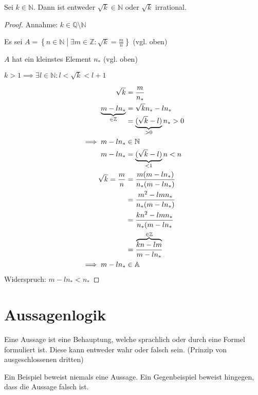 \begin{theorem}
  Sei $k \in \mathbb{N}$. Dann ist entweder $\sqrt{k} \in \mathbb{N}$ oder $\sqrt{k}$ irrational.
\end{theorem}
\begin{proof}
  Annahme: $k \in \mathbb{Q} \setminus \mathbb{N}$

  Es sei \( A = \left\{ n \in \mathbb{N} \middle| \exists m \in \mathbb{Z}: \sqrt{k} = \frac{m}{n} \right\} \) (vgl. oben)

  $A$ hat ein kleinstes Element $n_{*}$ (vgl. oben)

  $k > 1 \implies \exists l \in \mathbb{N}: l < \sqrt{k} < l+1$

  \begin{align*}
    \sqrt{k} &= \frac{m}{n_{*}} \\
    \smash{\underbrace{m - ln_{*}}_{\in \mathbb{Z}}} &= \sqrt{k} n_{*} - ln_{*} \\
    \, &= \underbrace{(\sqrt{k} - l)}_{> 0} n_{*} > 0 \\
    \implies m - ln_{*} &\in \mathbb{N} \\
    m-ln_{*} &= \underbrace{(\sqrt{k} - l)}_{< 1} n < n \\
    \sqrt{k} = \frac{m}{n} &= \frac{m(m-ln_{*})}{n_{*}(m-ln_{*})} \\
    \, &= \frac{m^2 - lmn_*}{n_{*}(m-ln_{*})} \\
    \, &= \frac{kn^2 - lmn_{*}}{n_{*}(m-ln_{*}} \\
    \, &= \frac{\overbrace{kn - lm}^{\in \mathbb{Z}}}{m-ln_{*}} \\
    \implies m-ln_{*} &\in \mathbb{A}
  \end{align*}
  Widerspruch: $m-ln_{*} < n_{*}$
\end{proof}

\section{Aussagenlogik}

\begin{definition}
  Eine Aussage ist eine Behauptung, welche sprachlich oder durch eine Formel formuliert ist. Diese kann entweder wahr oder falsch sein. (Prinzip von ausgeschlossenen dritten)
\end{definition}
\begin{remark}
  Ein Beispiel beweist niemals eine Aussage. Ein Gegenbeispiel beweist hingegen, dass die Aussage falsch ist.
\end{remark}

